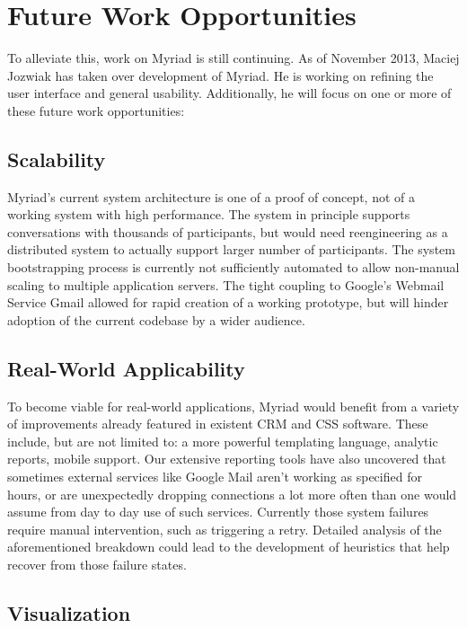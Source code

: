 \section{Future Work Opportunities}

To alleviate this, work on Myriad is still continuing. As of November 2013, Maciej Jozwiak has taken over development of Myriad. He is working on refining the user interface and general usability. Additionally, he will focus on one or more of these future work opportunities:

\subsection{Scalability}

Myriad’s current system architecture is one of a proof of concept, not of a working system with high performance. The system in principle supports conversations with thousands of participants, but would need reengineering as a distributed system to actually support larger number of participants.
The system bootstrapping process is currently not sufficiently automated to allow non-manual scaling to multiple application servers.
The tight coupling to Google’s Webmail Service Gmail allowed for rapid creation of a working prototype, but will hinder adoption of the current codebase by a wider audience.

\subsection{Real-World Applicability}

To become viable for real-world applications, Myriad would benefit from a variety of improvements already featured in existent CRM and CSS software. These include, but are not limited to: a more powerful templating language, analytic reports, mobile support. Our extensive reporting tools have also uncovered that sometimes external services like Google Mail aren't working as specified for hours, or are unexpectedly dropping connections a lot more often than one would assume from day to day use of such services. Currently those system failures require manual intervention, such as triggering a retry. Detailed analysis of the aforementioned breakdown could lead to the development of heuristics that help recover from those failure states.

\subsection{Visualization}

